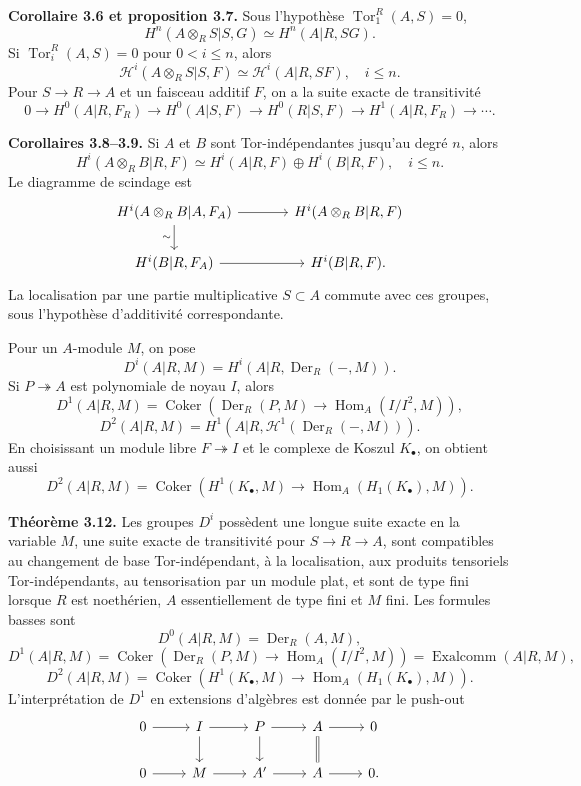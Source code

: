 \documentclass[11pt]{article}
\providecommand{\Tor}{\operatorname{Tor}}
\providecommand{\Hom}{\operatorname{Hom}}
\providecommand{\Der}{\operatorname{Der}}
\providecommand{\Coker}{\operatorname{Coker}}
\providecommand{\Exalcomm}{\operatorname{Exalcomm}}
\providecommand{\cH}{\mathcal H}
\begin{document}
\textbf{Corollaire 3.6 et proposition 3.7.}  Sous l'hypothèse \(\Tor^R_1(A,S)=0\),
\[
H^n(A\otimes_RS|S,G)\simeq H^n(A|R,SG).
\]
Si \(\Tor_i^R(A,S)=0\) pour \(0<i\le n\), alors
\[
\cH^i(A\otimes_RS|S,F)\simeq\cH^i(A|R,SF),\quad i\le n.
\]
Pour \(S\to R\to A\) et un faisceau additif \(F\), on a la suite exacte de transitivité
\[
0\to H^0(A|R,F_R)\to H^0(A|S,F)\to H^0(R|S,F)\to H^1(A|R,F_R)\to\cdots .
\]

\textbf{Corollaires 3.8--3.9.}  Si \(A\) et \(B\) sont Tor-indépendantes jusqu'au degré \(n\), alors
\[
H^i(A\otimes_RB|R,F)\simeq H^i(A|R,F)\oplus H^i(B|R,F),\quad i\le n.
\]
Le diagramme de scindage est
\[
\begin{tikzcd}[column sep=large]
H^i(A\otimes_RB|A,F_A) \arrow[r] \arrow[d,"\sim"'] & H^i(A\otimes_RB|R,F) \\
H^i(B|R,F_A) \arrow[r] & H^i(B|R,F).
\end{tikzcd}
\]
La localisation par une partie multiplicative \(S\subset A\) commute avec ces groupes, sous l'hypothèse d'additivité correspondante.

Pour un \(A\)-module \(M\), on pose
\[
D^i(A|R,M)=H^i(A|R,\Der_R(-,M)).
\]
Si \(P\twoheadrightarrow A\) est polynomiale de noyau \(I\), alors
\[
D^1(A|R,M)=\Coker(\Der_R(P,M)\to\Hom_A(I/I^2,M)),
\]
\[
D^2(A|R,M)=H^1(A|R,\cH^1(\Der_R(-,M))).
\]
En choisissant un module libre \(F\twoheadrightarrow I\) et le complexe de Koszul \(K_\bullet\), on obtient aussi
\[
D^2(A|R,M)=\Coker(H^1(K_\bullet,M)\to\Hom_A(H_1(K_\bullet),M)).
\]

\textbf{Théorème 3.12.}  Les groupes \(D^i\) possèdent une longue suite exacte en la variable \(M\), une suite exacte de transitivité pour \(S\to R\to A\), sont compatibles au changement de base Tor-indépendant, à la localisation, aux produits tensoriels Tor-indépendants, au tensorisation par un module plat, et sont de type fini lorsque \(R\) est noethérien, \(A\) essentiellement de type fini et \(M\) fini.  Les formules basses sont
\[
D^0(A|R,M)=\Der_R(A,M),
\]
\[
D^1(A|R,M)=\Coker(\Der_R(P,M)\to\Hom_A(I/I^2,M))=\Exalcomm(A|R,M),
\]
\[
D^2(A|R,M)=\Coker(H^1(K_\bullet,M)\to\Hom_A(H_1(K_\bullet),M)).
\]
L'interprétation de \(D^1\) en extensions d'algèbres est donnée par le push-out
\[
\begin{tikzcd}
0\arrow[r]&I\arrow[r]\arrow[d]&P\arrow[r]\arrow[d]&A\arrow[r]\arrow[d,equal]&0\\
0\arrow[r]&M\arrow[r]&A'\arrow[r]&A\arrow[r]&0.
\end{tikzcd}
\]
\end{document}
